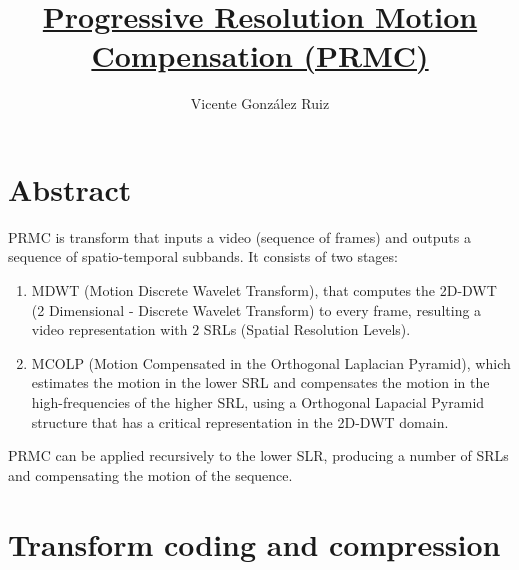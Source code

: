 
\title{\href{https://github.com/Sistemas-Multimedia/PRMC}{Progressive Resolution Motion Compensation (PRMC)}}

\author{Vicente González Ruiz}


\maketitle

\tableofcontents

\section*{Abstract}

PRMC is transform that inputs a video (sequence of frames) and outputs a sequence of spatio-temporal subbands. It consists of two stages:

\begin{enumerate}
\item MDWT (Motion Discrete Wavelet Transform), that computes the
  2D-DWT (2 Dimensional - Discrete Wavelet Transform) to every frame,
  resulting a video representation with $2$ SRLs (Spatial Resolution
  Levels).
\item MCOLP (Motion Compensated in the Orthogonal Laplacian Pyramid),
  which estimates the motion in the lower SRL and compensates the
  motion in the high-frequencies of the higher SRL, using a Orthogonal
  Lapacial Pyramid structure that has a critical representation in the
  2D-DWT domain.
\end{enumerate}
PRMC can be applied recursively to the lower SLR, producing a number of SRLs and compensating the motion of the sequence.


\section{Transform coding and compression}

